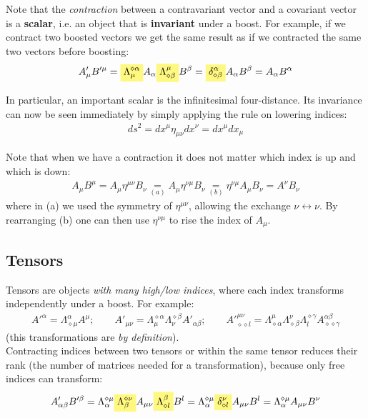 \documentclass[../template.tex]{subfiles}
\begin{document}
Note that the \textit{contraction} between a contravariant vector and a covariant vector is a \textbf{scalar}, i.e. an object that is \textbf{invariant} under a boost.
For example, if we contract two boosted vectors we get the same result as if we contracted the same two vectors before boosting:
\begin{align*}
A'_\mu B'^\mu = \hlc{Yellow}{\Lambda_\mu^{\diamond\alpha}} A_\alpha \hlc{Yellow}{\Lambda^\mu_{\diamond\beta}}B^\beta = \hlc{Yellow}{\delta^\alpha_{\diamond\beta} }A_\alpha B^\beta = A_\alpha B^\alpha
\end{align*}

In particular, an important scalar is the infinitesimal four-distance. Its invariance can now be seen immediately by simply applying the rule on lowering indices:
\begin{align*}
ds^2 = dx^\mu \eta_{\mu\nu}dx^\nu = dx^\mu dx_\mu
\end{align*}

Note that when we have a contraction it does not matter which index is up and which is down:
\begin{align*}
A_\mu B^\mu =A_\mu \eta^{\mu\nu}B_\nu \underset{(a)}{=} A_\mu \eta^{\nu\mu} B_\nu \underset{(b)}{=} \eta^{\nu\mu} A_\mu B_\nu = A^\nu B_\nu
\end{align*}
where in (a) we used the symmetry of $\eta^{\mu\nu}$, allowing the exchange $\nu\leftrightarrow \nu$. By rearranging (b) one can then use $\eta^{\nu\mu}$ to rise the index of $A_\mu$.

\subsection{Tensors}
Tensors are objects \textit{with many high/low indices}, where each index transforms independently under a boost. For example:
\begin{align*}
A'^\alpha = \Lambda^\alpha_{\diamond \mu} A^\mu; \qquad A'_{\mu\nu} = \Lambda^{\diamond\alpha}_\mu \Lambda^{\diamond\beta}_{\nu} A'_{\alpha\beta}; \qquad A'^{\mu\nu}_{\diamond\diamond l} = \Lambda^{\mu}_{\diamond \alpha}\Lambda^\nu
_{\diamond\beta}\Lambda^{\diamond\gamma}_{l}A^{\alpha\beta}_{\diamond\diamond\gamma}\end{align*}
(this transformations are \textit{by definition}).\\

Contracting indices between two tensors or within the same tensor reduces their rank (the number of matrices needed for a transformation), because only free indices can transform:
\begin{align*}
A'_{\alpha\beta}B'^\beta = \Lambda_{\alpha}^{\diamond \mu}\hlc{Yellow}{\Lambda_{\beta}^{\diamond \nu}}A_{\mu\nu}\hlc{Yellow}{\Lambda^\beta_{\diamond l}}B^l = \Lambda_\alpha^{\diamond \mu}\hlc{Yellow}{\delta^\nu
_{\diamond l} }A_{\mu\nu} B^l = \Lambda^{\diamond \mu}_\alpha A_{\mu\nu} B^\nu
\end{align*}
\end{document}
